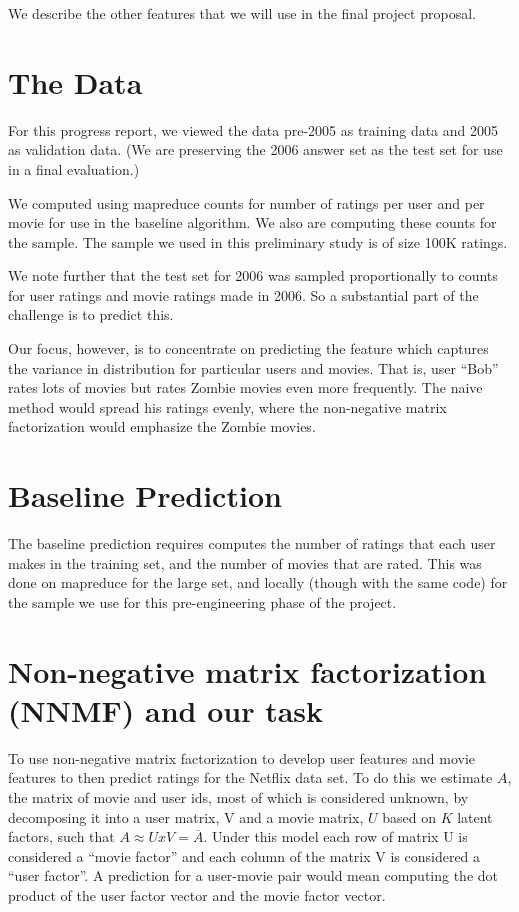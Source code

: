 \documentclass[11pt]{article}
\begin{document}
We describe the other features that we will use
in the final project proposal. 

\section{The Data}

For this progress report, we viewed the data pre-2005 as training data
and 2005 as validation data. (We are preserving the 2006 answer
set as the test set for use in a final evaluation.)

We computed using mapreduce counts for number of ratings per user
and per movie for use in the baseline algorithm. We also
are computing these counts for the sample.  The sample
we used in this preliminary study is of size 100K ratings.

We note further that the test set for 2006 was sampled
proportionally to counts for user ratings and movie ratings
made in 2006.  So a substantial part of the challenge
is to predict this. 

Our focus, however, is to concentrate on predicting the feature which
captures the variance in distribution for particular users and movies.
That is, user ``Bob'' rates lots of movies but rates Zombie movies
even more frequently. The naive method would spread his ratings
evenly, where the non-negative matrix factorization would emphasize
the Zombie movies.

\section{Baseline Prediction}

The baseline prediction requires computes the number of ratings that
each user makes in the training set, and the number of
movies that are rated.  This was done on mapreduce
for the large set, and locally (though with the same code)
for the sample we use for this pre-engineering phase
of the project.

\section{Non-negative matrix factorization (NNMF) and our task}

To use non-negative matrix factorization to develop user features and
movie features to then predict ratings for the Netflix data set. To do
this we estimate $A$, the matrix of movie and user ids, most of which
is considered unknown, by decomposing it into a user matrix, V and a
movie matrix, $U$ based on $K$ latent factors, such that $A \approx U
x V = \overline{A}$.  Under this model each row of matrix U is
considered a “movie factor” and each column of the matrix V is
considered a ``user factor''. A prediction for a user-movie pair would
mean computing the dot product of the user factor vector and the movie
factor vector.
\end{document}
